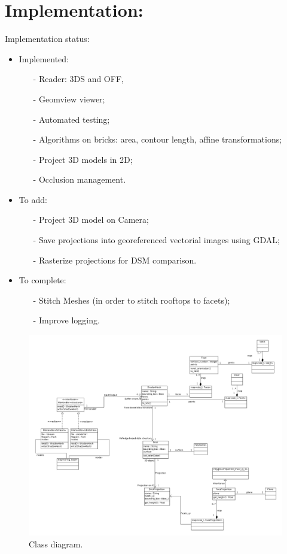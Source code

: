 \documentclass[a4paper, 11pt]{article}
\begin{document}
	\section*{Implementation:}
	Implementation status:
	\begin{itemize}
		\item Implemented:
			\begin{itemize}
				\item[-] Reader: 3DS and OFF,
				\item[-] Geomview viewer;
				\item[-] Automated testing;
				\item[-] Algorithms on bricks: area, contour length, affine transformations;
				\item[-] Project 3D models in 2D;
				\item[-] Occlusion management.
			\end{itemize}
		\item To add:
			\begin{itemize}
				\item[-] Project 3D model on Camera;
				\item[-] Save projections into georeferenced vectorial images using GDAL;
				\item[-] Rasterize projections for DSM comparison.
			\end{itemize}
		\item To complete:
			\begin{itemize}
				\item[-] Stitch Meshes (in order to stitch rooftops to facets);
				\item[-] Improve logging.
			\end{itemize}
	\end{itemize}
	
	\begin{figure}[H]
		\caption{\label{diag::class} Class diagram.}
		\includegraphics[scale=.3]{images/vectorial/class_diagram.png}
	\end{figure}
	
\end{document}
